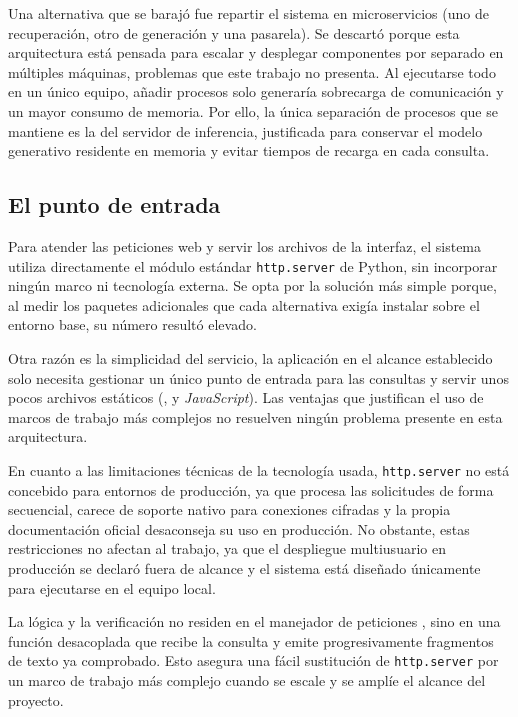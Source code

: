 Una alternativa que se barajó fue repartir el sistema en microservicios (uno de recuperación, otro de generación y una pasarela). Se descartó porque esta arquitectura está pensada para escalar y desplegar componentes por separado en múltiples máquinas, problemas que este trabajo no presenta. Al ejecutarse todo en un único equipo, añadir procesos solo generaría sobrecarga de comunicación y un mayor consumo de memoria. Por ello, la única separación de procesos que se mantiene es la del servidor de inferencia, justificada para conservar el modelo generativo residente en memoria y evitar tiempos de recarga en cada consulta.

\subsection[El punto de entrada]{El punto de entrada}
\label{secc:fase3_punto_entrada}

Para atender las peticiones web y servir los archivos de la interfaz, el sistema utiliza directamente el módulo estándar \texttt{http.server} de Python, sin incorporar ningún marco ni tecnología externa. Se opta por la solución más simple porque, al medir los paquetes adicionales que cada alternativa exigía instalar sobre el entorno base, su número resultó elevado.

Otra razón es la simplicidad del servicio, la aplicación en el alcance establecido solo necesita gestionar un único punto de entrada para las consultas y servir unos pocos archivos estáticos (,  y \textit{JavaScript}). Las ventajas que justifican el uso de marcos de trabajo más complejos no resuelven ningún problema presente en esta arquitectura.

En cuanto a las limitaciones técnicas de la tecnología usada, \texttt{http.server} no está concebido para entornos de producción, ya que procesa las solicitudes de forma secuencial, carece de soporte nativo para conexiones cifradas  y la propia documentación oficial desaconseja su uso en producción. No obstante, estas restricciones no afectan al trabajo, ya que el despliegue multiusuario en producción se declaró fuera de alcance y el sistema está diseñado únicamente para ejecutarse en el equipo local. 

La lógica y la verificación no residen en el manejador de peticiones , sino en una función desacoplada que recibe la consulta y emite progresivamente fragmentos de texto ya comprobado. Esto asegura una fácil sustitución de \texttt{http.server} por un marco de trabajo más complejo cuando se escale y se amplíe el alcance del proyecto.

